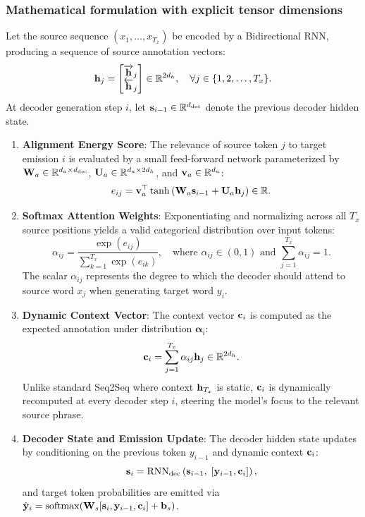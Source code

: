 \documentclass[../../main.tex]{subfiles}
\begin{document}
\subsubsection{Mathematical formulation with explicit tensor dimensions}
Let the source sequence $(x_1, \dots, x_{T_x})$ be encoded by a Bidirectional RNN, producing a sequence of source annotation vectors:
\begin{equation}
\mathbf{h}_j = \begin{bmatrix} \overrightarrow{\mathbf{h}}_j \\ \overleftarrow{\mathbf{h}}_j \end{bmatrix} \in \mathbb{R}^{2d_h}, \quad \forall j \in \{1, 2, \dots, T_x\}.
\end{equation}
At decoder generation step $i$, let $\mathbf{s}_{i-1} \in \mathbb{R}^{d_{\text{dec}}}$ denote the previous decoder hidden state.
\begin{enumerate}
    \item \textbf{Alignment Energy Score}: The relevance of source token $j$ to target emission $i$ is evaluated by a small feed-forward network parameterized by $\mathbf{W}_a \in \mathbb{R}^{d_a \times d_{\text{dec}}}$, $\mathbf{U}_a \in \mathbb{R}^{d_a \times 2d_h}$, and $\mathbf{v}_a \in \mathbb{R}^{d_a}$:
    \begin{equation}
    \label{eq:rnn_bahdanau_score}
    e_{ij} = \mathbf{v}_a^\top \tanh\left( \mathbf{W}_a \mathbf{s}_{i-1} + \mathbf{U}_a \mathbf{h}_j \right) \in \mathbb{R}.
    \end{equation}
    \item \textbf{Softmax Attention Weights}: Exponentiating and normalizing across all $T_x$ source positions yields a valid categorical distribution over input tokens:
    \begin{equation}
    \label{eq:rnn_bahdanau_weights}
    \alpha_{ij} = \frac{\exp(e_{ij})}{\sum_{k=1}^{T_x} \exp(e_{ik})}, \quad \text{where } \alpha_{ij} \in (0, 1) \text{ and } \sum_{j=1}^{T_x} \alpha_{ij} = 1.
    \end{equation}
    The scalar $\alpha_{ij}$ represents the degree to which the decoder should attend to source word $x_j$ when generating target word $y_i$.
    \item \textbf{Dynamic Context Vector}: The context vector $\mathbf{c}_i$ is computed as the expected annotation under distribution $\boldsymbol{\alpha}_i$:
    \begin{equation}
    \label{eq:rnn_bahdanau_context}
    \mathbf{c}_i = \sum_{j=1}^{T_x} \alpha_{ij} \mathbf{h}_j \in \mathbb{R}^{2d_h}.
    \end{equation}
    Unlike standard Seq2Seq where context $\mathbf{h}_{T_x}$ is static, $\mathbf{c}_i$ is dynamically recomputed at every decoder step $i$, steering the model's focus to the relevant source phrase.
    \item \textbf{Decoder State and Emission Update}: The decoder hidden state updates by conditioning on the previous token $y_{i-1}$ and dynamic context $\mathbf{c}_i$:
    \begin{equation}
    \label{eq:rnn_bahdanau_decoder_update}
    \mathbf{s}_i = \operatorname{RNN}_{\text{dec}}\left( \mathbf{s}_{i-1}, \; [\mathbf{y}_{i-1}, \mathbf{c}_i] \right),
    \end{equation}
    and target token probabilities are emitted via $\hat{\mathbf{y}}_i = \operatorname{\mathrm{softmax}}(\mathbf{W}_s [\mathbf{s}_i, \mathbf{y}_{i-1}, \mathbf{c}_i] + \mathbf{b}_s)$.
\end{enumerate}
\end{document}
